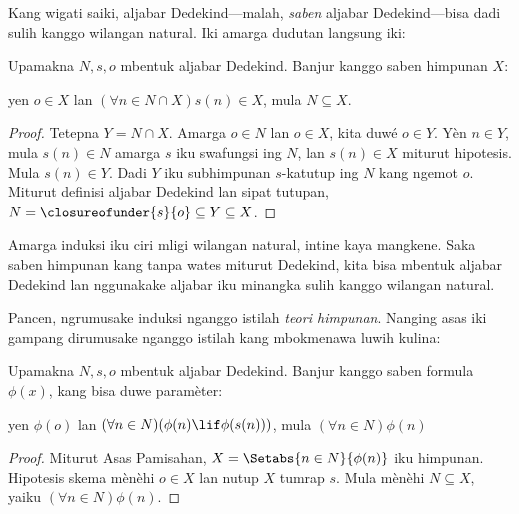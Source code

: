 \documentclass[../../../include/open-logic-section]{subfiles}
\begin{document}

Kang wigati saiki, aljabar Dedekind---malah, \emph{saben} aljabar
Dedekind---bisa dadi sulih kanggo wilangan natural. Iki amarga dudutan
langsung iki:

\begin{thm}
Upamakna $N, s, o$ mbentuk aljabar Dedekind. Banjur kanggo saben
himpunan $X$:
	\begin{center}
		yen $o \in X$ lan $(\forall {n} \in N \cap X){s}({n}) \in X$, {mula} $N \subseteq X$.
	\end{center}
\end{thm}

\begin{proof}
Tetepna $Y=N\cap X$. Amarga $o\in N$ lan $o\in X$, kita
duwé $o\in Y$. Yèn $n\in Y$, mula $s(n)\in N$ amarga $s$
iku swafungsi ing $N$, lan $s(n)\in X$ miturut hipotesis. Mula
$s(n)\in Y$. Dadi $Y$ iku subhimpunan $s$-katutup ing $N$ kang
ngemot $o$. Miturut definisi aljabar Dedekind lan sipat tutupan,
$N=\closureofunder{s}{o}\subseteq Y\subseteq X$.
\end{proof}

Amarga induksi iku ciri mligi wilangan natural, intine kaya mangkene. Saka
saben himpunan kang tanpa wates miturut Dedekind, kita bisa mbentuk
aljabar Dedekind lan nggunakake aljabar iku minangka sulih kanggo
wilangan natural.

Pancen,  ngrumusake induksi nganggo
istilah \emph{teori himpunan}. Nanging asas iki gampang dirumusake nganggo
istilah kang mbokmenawa luwih kulina:

\begin{cor}
Upamakna $N, s, o$ mbentuk aljabar Dedekind. Banjur kanggo saben formula
$\phi(x)$, kang bisa duwe paramèter:
\begin{center}
	yen $\phi(o)$ lan $(\forall {n} \in N)(\phi(n)\lif
	\phi({s}({n})))$, {mula} $(\forall n \in N)\phi(n)$
\end{center}
\end{cor}

\begin{proof}
Miturut Asas Pamisahan, $X = \Setabs{n \in N}{\phi(n)}$ iku
himpunan. Hipotesis skema mènèhi $o\in X$ lan nutup $X$ tumrap
$s$. Mula  mènèhi $N\subseteq X$,
yaiku $(\forall n\in N)\phi(n)$.
\end{proof}
\end{document}
